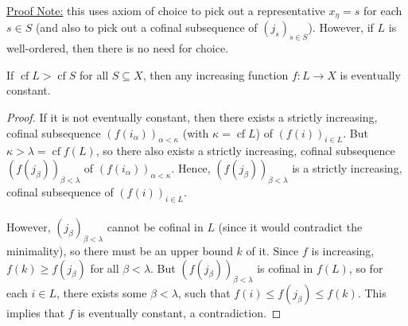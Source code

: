 \documentclass{treatise}
\begin{document}
\underline{Proof Note:} this uses axiom of choice to pick out a representative $x_\eta = s$ for each $s \in S$ (and also to pick out a cofinal subsequence of $(j_s)_{s \in S}$). However, if $L$ is well-ordered, then there is no need for choice.
\begin{corollary}
If $\operatorname{cf} L > \operatorname{cf} S$ for all $S \subseteq X$, then any increasing function $f: L \to X$ is eventually constant.
\end{corollary}
\begin{proof}
If it is not eventually constant, then there exists a strictly increasing, cofinal subsequence $(f(i_\alpha))_{\alpha < \kappa}$ (with $\kappa = \operatorname{cf} L$) of $(f(i))_{i \in L}$. But $\kappa > \lambda = \operatorname{cf} f(L)$, so there also exists a strictly increasing, cofinal subsequence $(f(j_\beta))_{\beta < \lambda}$ of $(f(i_\alpha))_{\alpha < \kappa}$. Hence, $(f(j_\beta))_{\beta < \lambda}$ is a strictly increasing, cofinal subsequence of $(f(i))_{i \in L}$.
\\
\\
However, $(j_\beta)_{\beta < \lambda}$ cannot be cofinal in $L$ (since it would contradict the minimality), so there must be an upper bound $k$ of it. Since $f$ is increasing, $f(k) \geq f(j_\beta)$ for all $\beta < \lambda$. But $(f(j_\beta))_{\beta < \lambda}$ is cofinal in $f(L)$, so for each $i \in L$, there exists some $\beta < \lambda$, such that $f(i) \leq f(j_\beta) \leq f(k)$. This implies that $f$ is eventually constant, a contradiction.
\end{proof}
\end{document}
